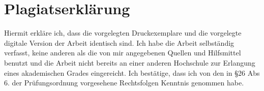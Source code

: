 \newpage
\section*{Plagiatserklärung} %
Hiermit erkläre ich, dass die vorgelegten Druckexemplare und die vorgelegte digitale Version der Arbeit identisch sind.
Ich habe die Arbeit selbständig verfasst, keine anderen als die von mir angegebenen Quellen und Hilfsmittel benutzt und die Arbeit nicht bereits an einer anderen Hochschule zur Erlangung eines akademischen Grades eingereicht.
Ich bestätige, dass ich von den in §26 Abs 6. der Prüfungsordnung vorgesehene Rechtsfolgen Kenntnis genommen habe.

\vspace{2cm} %

\noindent\makebox[0.3\textwidth]{\hrulefill} \hfill \makebox[0.3\textwidth]{\hrulefill}

\noindent{} \hfill {}
